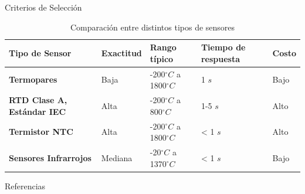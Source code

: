 \documentclass[aspectratio=169]{beamer}
\begin{document}
\begin{frame}{Criterios de Selección}
  \begin{table}[]
    \centering
    \begin{tabular}{m{2cm}|m{1.5cm}|m{1.55cm}|m{2cm} | m{1.4cm}}
     \hline
         \hline
        \textbf{Tipo de Sensor} & \textbf{Exactitud} &\textbf{Rango típico} & \textbf{Tiempo de respuesta} & \textbf{Costo} \\
         \hline
         \hline
       \textbf{Termopares} & Baja & -200$ ^{\circ} C$ a 1800$ ^{\circ} C$ & 1 $s$ & Bajo\\
       \textbf{RTD Clase A, Estándar IEC} & Alta & -200$ ^{\circ} C$ a 800$ ^{\circ} C$ & 1-5 $s$ & Alto\\
         \textbf{Termistor NTC} & Alta & -200$ ^{\circ} C$ a 1800$ ^{\circ} C$ & < 1 $s$ & Alto\\
        \textbf{Sensores Infrarrojos} & Mediana & -20$ ^{\circ} C$ a 1370$ ^{\circ} C$ & < 1 $s$ & Bajo \\
    \end{tabular}
    \caption{Comparación entre distintos tipos de sensores}
    \label{tab:Comparacion}
\end{table}
\end{frame}

\begin{frame}{Referencias}

\footnotesize

\end{frame}
\end{document}
